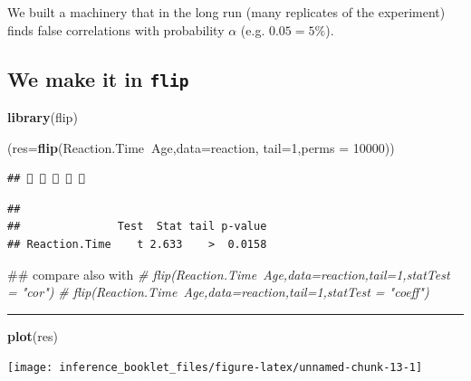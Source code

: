 \documentclass[]{article}
\newenvironment{Shaded}{\begin{snugshade}}{\end{snugshade}}
\newcommand{\KeywordTok}[1]{\textcolor[rgb]{0.13,0.29,0.53}{\textbf{#1}}}
\newcommand{\DataTypeTok}[1]{\textcolor[rgb]{0.13,0.29,0.53}{#1}}
\newcommand{\DecValTok}[1]{\textcolor[rgb]{0.00,0.00,0.81}{#1}}
\newcommand{\CommentTok}[1]{\textcolor[rgb]{0.56,0.35,0.01}{\textit{#1}}}
\newcommand{\OperatorTok}[1]{\textcolor[rgb]{0.81,0.36,0.00}{\textbf{#1}}}
\newcommand{\NormalTok}[1]{#1}
\begin{document}
We built a machinery that in the long run (many replicates of the
experiment) finds false correlations with probability \(\alpha\) (e.g.
\(0.05=5\%\)).

\subsection{\texorpdfstring{We make it in
\texttt{flip}}{We make it in flip}}\label{we-make-it-in-flip}

\begin{Shaded}
\begin{Highlighting}[]
\KeywordTok{library}\NormalTok{(flip)}

\NormalTok{(}\DataTypeTok{res=}\KeywordTok{flip}\NormalTok{(Reaction.Time}\OperatorTok{~}\NormalTok{Age,}\DataTypeTok{data=}\NormalTok{reaction,}
          \DataTypeTok{tail=}\DecValTok{1}\NormalTok{,}\DataTypeTok{perms =} \DecValTok{10000}\NormalTok{))}
\end{Highlighting}
\end{Shaded}

\begin{verbatim}
##     
\end{verbatim}

\begin{verbatim}
## 
##               Test  Stat tail p-value
## Reaction.Time    t 2.633    >  0.0158
\end{verbatim}

\begin{Shaded}
\begin{Highlighting}[]
\NormalTok{## compare also with}
\CommentTok{# flip(Reaction.Time~Age,data=reaction,tail=1,statTest = "cor")}
\CommentTok{# flip(Reaction.Time~Age,data=reaction,tail=1,statTest = "coeff")}
\end{Highlighting}
\end{Shaded}

\begin{center}\rule{0.5\linewidth}{\linethickness}\end{center}

\begin{Shaded}
\begin{Highlighting}[]
\KeywordTok{plot}\NormalTok{(res)}
\end{Highlighting}
\end{Shaded}

\begin{center}\texttt{[image: inference\_booklet\_files/figure-latex/unnamed-chunk-13-1]} \end{center}
\end{document}
